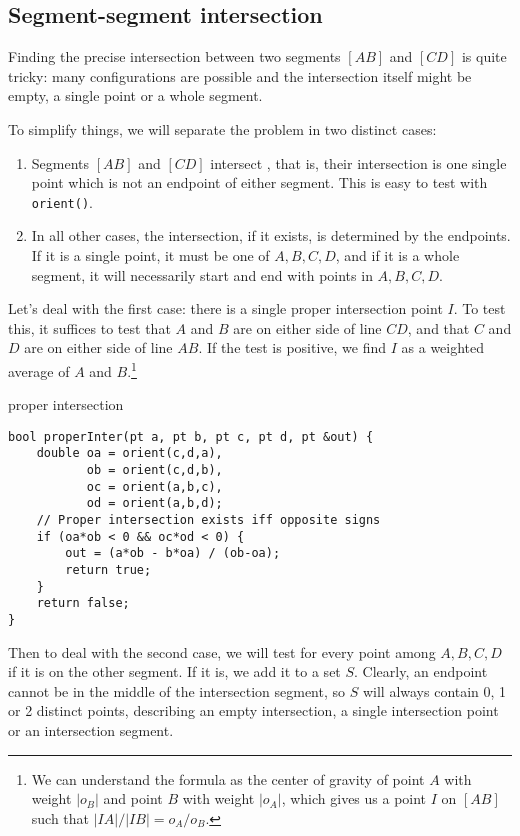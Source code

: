 \subsection{Segment-segment intersection}\label{ss:seg-seg-inter}
Finding the precise intersection between two segments $[AB]$ and $[CD]$ is quite tricky: many configurations are possible and the intersection itself might be empty, a single point or a whole segment.

To simplify things, we will separate the problem in two distinct cases:
\begin{enumerate}
\item Segments $[AB]$ and $[CD]$ intersect , that is, their intersection is one single point which is not an endpoint of either segment. This is easy to test with \lstinline|orient()|.
\item In all other cases, the intersection, if it exists, is determined by the endpoints. If it is a single point, it must be one of $A,B,C,D$, and if it is a whole segment, it will necessarily start and end with points in $A,B,C,D$.
\end{enumerate}

Let's deal with the first case: there is a single proper intersection point $I$. To test this, it suffices to test that $A$ and $B$ are on either side of line $CD$, and that $C$ and $D$ are on either side of line $AB$. If the test is positive, we find $I$ as a weighted average of $A$ and $B$.\footnote{We can understand the formula as the center of gravity of point $A$ with weight $|o_B|$ and point $B$ with weight $|o_A|$, which gives us a point $I$ on $[AB]$ such that $|IA|/|IB| = o_A/o_B$.}

\begin{center}

proper intersection
\end{center}
\begin{lstlisting}
bool properInter(pt a, pt b, pt c, pt d, pt &out) {
    double oa = orient(c,d,a),
           ob = orient(c,d,b),
           oc = orient(a,b,c),
           od = orient(a,b,d);
    // Proper intersection exists iff opposite signs
    if (oa*ob < 0 && oc*od < 0) {
        out = (a*ob - b*oa) / (ob-oa);
        return true;
    }
    return false;
}
\end{lstlisting}

Then to deal with the second case, we will test for every point among $A,B,C,D$ if it is on the other segment. If it is, we add it to a set $S$. Clearly, an endpoint cannot be in the middle of the intersection segment, so $S$ will always contain 0, 1 or 2 distinct points, describing an empty intersection, a single intersection point or an intersection segment.

